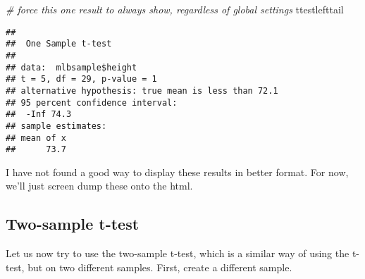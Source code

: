 \documentclass[
]{article}
\newenvironment{Shaded}{\begin{snugshade}}{\end{snugshade}}
\newcommand{\AttributeTok}[1]{\textcolor[rgb]{0.77,0.63,0.00}{#1}}
\newcommand{\CommentTok}[1]{\textcolor[rgb]{0.56,0.35,0.01}{\textit{#1}}}
\newcommand{\ConstantTok}[1]{\textcolor[rgb]{0.00,0.00,0.00}{#1}}
\newcommand{\DecValTok}[1]{\textcolor[rgb]{0.00,0.00,0.81}{#1}}
\newcommand{\FunctionTok}[1]{\textcolor[rgb]{0.00,0.00,0.00}{#1}}
\newcommand{\NormalTok}[1]{#1}
\newcommand{\OtherTok}[1]{\textcolor[rgb]{0.56,0.35,0.01}{#1}}
\newcommand{\SpecialCharTok}[1]{\textcolor[rgb]{0.00,0.00,0.00}{#1}}
\begin{document}
\begin{Shaded}
\begin{Highlighting}[]
\CommentTok{\# force this one result to always show, regardless of global settings}
\NormalTok{ttestlefttail}
\end{Highlighting}
\end{Shaded}

\begin{verbatim}
## 
##  One Sample t-test
## 
## data:  mlbsample$height
## t = 5, df = 29, p-value = 1
## alternative hypothesis: true mean is less than 72.1
## 95 percent confidence interval:
##  -Inf 74.3
## sample estimates:
## mean of x 
##      73.7
\end{verbatim}

I have not found a good way to display these results in better format.
For now, we'll just screen dump these onto the html.

\hypertarget{two-sample-t-test}{%
\subsection{Two-sample t-test}\label{two-sample-t-test}}

Let us now try to use the two-sample t-test, which is a similar way of
using the t-test, but on two different samples. First, create a
different sample.

\begin{Shaded}
\end{Shaded}
\end{document}
